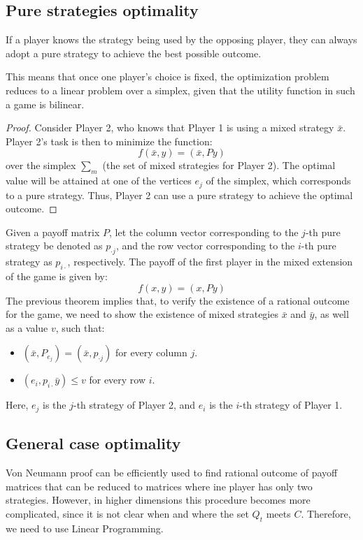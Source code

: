\subsection{Pure strategies optimality}
\begin{theorem}
    If a player knows the strategy being used by the opposing player, they can always adopt a pure strategy to achieve the best possible outcome.
\end{theorem}
This means that once one player's choice is fixed, the optimization problem reduces to a linear problem over a simplex, given that the utility function in such a game is bilinear.
\begin{proof}
    Consider Player 2, who knows that Player 1 is using a mixed strategy $\bar{x}$. 
    Player 2's task is then to minimize the function:
    \[f (\bar{x}, y) = (\bar{x}, Py)\]
    over the simplex $\sum_m$ (the set of mixed strategies for Player 2). 
    The optimal value will be attained at one of the vertices $e_j$ of the simplex, which corresponds to a pure strategy.
    Thus, Player 2 can use a pure strategy to achieve the optimal outcome.
\end{proof}
Given a payoff matrix  $P$, let the column vector corresponding to the $j$-th pure strategy be denoted as $p_{\cdot j}$, and the row vector corresponding to the $i$-th pure strategy as $p_{i\cdot}$, respectively. 
The payoff of the first player in the mixed extension of the game is given by:
\[f(x,y)=(x,Py)\]
The previous theorem implies that, to verify the existence of a rational outcome for the game, we need to show the existence of mixed strategies $\bar{x}$ and $\bar{y}$, as well as a value $v$, such that: 
\begin{itemize}
    \item $(\bar{x},P_{e_j})=(\bar{x},p_{\cdot j})$ for every column $j$. 
    \item $(e_i,p_{i\cdot}\bar{y})\leq v$ for every row $i$.
\end{itemize}
Here, $e_j$ is the $j$-th strategy of Player 2, and $e_i$ is the $i$-th strategy of Player 1.





\subsection{General case optimality}
Von Neumann proof can be efficiently used to find rational outcome of payoff matrices that can be reduced to matrices where ine player has only two strategies. 
However, in higher dimensions this procedure becomes more complicated, since it is not clear when and where the set $Q_t$ meets $C$. 
Therefore, we need to use Linear Programming. 

